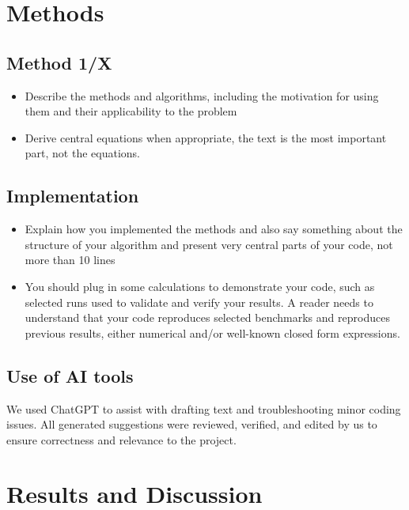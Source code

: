\documentclass[amssymb,twocolumn,aps]{revtex4}
\begin{document}
\section{Methods}\label{section:methods}

\subsection{Method 1/X}

\begin{itemize}
    \item Describe the methods and algorithms, including the motivation for using them and their applicability to the problem
    \item Derive central equations when appropriate, the text is the most important part, not the equations.
\end{itemize}

\subsection{Implementation}

\begin{itemize}
    \item Explain how you implemented the methods and also say something about the structure of your algorithm and present very central parts of your code, not more than 10 lines
    \item You should plug in some calculations to demonstrate your code, such as selected runs used to validate and verify your results. A reader needs to understand that your code reproduces selected benchmarks and reproduces previous results, either numerical and/or well-known closed form expressions.
\end{itemize}

\subsection{Use of AI tools}

We used ChatGPT to assist with drafting text and troubleshooting minor coding issues. All generated suggestions were reviewed, verified, and edited by us to ensure correctness and relevance to the project.
	
\section{Results and Discussion}\label{section:results} 
\end{document}
